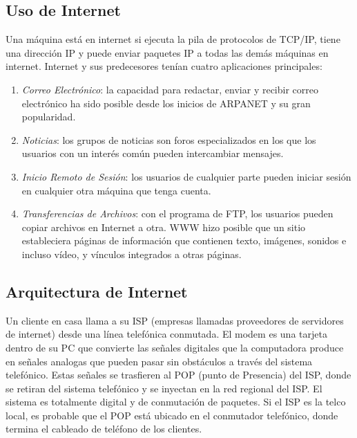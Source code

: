 \documentclass[12pt]{report}
\begin{document}
\subsection*{Uso de Internet}

Una m\'aquina est\'a en internet si ejecuta la pila de protocolos de TCP/IP, tiene una direcci\'on IP y puede enviar paquetes IP a todas las dem\'as m\'aquinas en internet. 
Internet y sus predecesores ten\'ian cuatro aplicaciones principales: 
\begin{enumerate}

\item \textit {Correo Electr\'onico}: la capacidad para  redactar, enviar y recibir correo electr\'onico ha sido posible desde los inicios de ARPANET y su gran popularidad.

\item \textit {Noticias}: los grupos de noticias son foros especializados en los que los usuarios con un inter\'es com\'un pueden intercambiar mensajes.

\item \textit {Inicio Remoto de Sesi\'on}: los usuarios de cualquier parte pueden iniciar sesi\'on en cualquier otra m\'aquina que tenga cuenta.

\item \textit {Transferencias de Archivos}: con el programa de FTP, los usuarios pueden copiar archivos en Internet a otra. WWW hizo posible que un sitio estableciera  p\'aginas de informaci\'on que contienen texto, im\'agenes, sonidos e incluso v\'ideo, y v\'inculos integrados   a otras p\'aginas.
\end{enumerate}


\subsection*{Arquitectura de Internet}

Un cliente en casa llama a su ISP (empresas llamadas proveedores de servidores de internet) desde una l\'inea telef\'onica conmutada. El modem es una tarjeta dentro de su PC que convierte las se\~nales digitales que la computadora produce en se\~nales analogas que pueden pasar sin obst\'aculos a trav\'es del sistema telef\'onico. Estas se\~nales se trasfieren al POP (punto de Presencia) del ISP, donde se retiran del sistema telef\'onico y se inyectan en la red regional del ISP. El sistema es totalmente digital y de conmutación de paquetes. Si el ISP es la telco local, es probable que el POP est\'a ubicado en el conmutador telef\'onico, donde termina el cableado de tel\'efono de los clientes.   
\end{document}
